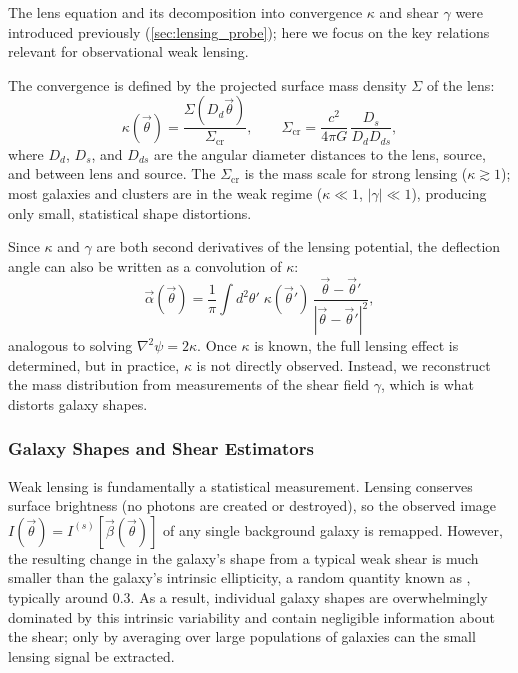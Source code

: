 The lens equation and its decomposition into convergence $\kappa$ and shear $\gamma$ were introduced previously (\cref{sec:lensing_probe}); here we focus on the key relations relevant for observational weak lensing.

\smallskip

The convergence is defined by the projected surface mass density $\Sigma$ of the lens:
$$
\kappa(\vec\theta) = \frac{\Sigma(D_d\vec\theta)}{\Sigma_{\text{cr}}} , \qquad
\Sigma_{\text{cr}} = \frac{c^2}{4\pi G}\,\frac{D_s}{D_d D_{ds}} ,
$$
where $D_d$, $D_s$, and $D_{ds}$ are the angular diameter distances to the lens, source, and between lens and source. The  $\Sigma_{\text{cr}}$ is the mass scale for strong lensing ($\kappa \gtrsim 1$); most galaxies and clusters are in the weak regime ($\kappa \ll 1$, $|\gamma| \ll 1$), producing only small, statistical shape distortions.

\medskip

Since $\kappa$ and $\gamma$ are both second derivatives of the lensing potential, the deflection angle can also be written as a convolution of $\kappa$:
$$
\vec\alpha(\vec\theta) = \frac{1}{\pi}\int d^2\theta'\; \kappa(\vec\theta')\,\frac{\vec\theta-\vec\theta'}{|\vec\theta-\vec\theta'|^2} ,
$$
analogous to solving $\nabla^2\psi = 2\kappa$. Once $\kappa$ is known, the full lensing effect is determined, but in practice, $\kappa$ is not directly observed. Instead, we reconstruct the mass distribution from measurements of the shear field $\gamma$, which is what distorts galaxy shapes.

\subsubsection{Galaxy Shapes and Shear Estimators} \label{sec:wl_shapes}

Weak lensing is fundamentally a statistical measurement. Lensing conserves surface brightness (no photons are created or destroyed), so the observed image $I(\vec\theta) = I^{(s)}[\vec\beta(\vec\theta)]$ of any single background galaxy is remapped. However, the resulting change in the galaxy's shape from a typical weak shear is much smaller than the galaxy's intrinsic ellipticity, a random quantity known as , typically around $0.3$. As a result, individual galaxy shapes are overwhelmingly dominated by this intrinsic variability and contain negligible information about the shear; only by averaging over large populations of galaxies can the small lensing signal be extracted.

